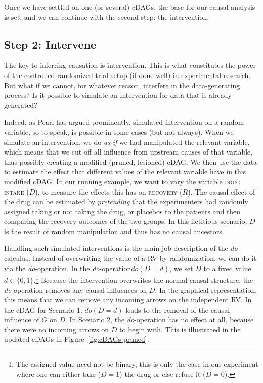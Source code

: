 \documentclass[nobib]{tufte-handout}
\newcommand{\docalc}{\emph{do}-calculus\xspace}
\newcommand{\doop}{\emph{do}-operation\xspace}
\newcommand{\mathdo}{\mathit{do}}
\begin{document}
Once we have settled on one (or several) cDAGs, the base for our causal analysis is set, and we can continue with the second step: the intervention.


\subsection{Step 2: Intervene} \label{sec:step2}

The key to inferring causation is intervention.
This is what constitutes the power of the controlled randomized trial setup (if done well) in experimental research.
But what if we cannot, for whatever reason, interfere in the data-generating process?
Is it possible to simulate an intervention for data that is already generated?


Indeed, as Pearl has argued prominently, simulated intervention on a random variable, so to speak, is possible in some cases (but not always). 
When we simulate an intervention, we do \textit{as if} we had manipulated the relevant variable, which means that we cut off all influence from upstream causes of that variable, thus possibly creating a modified (pruned, lesioned) cDAG.
We then use the data to estimate the effect that different values of the relevant variable have in this modified cDAG.
In our running example, we want to vary the variable \textsc{drug intake} ($D$), to measure the effects this has on \textsc{recovery} ($R$).
The causal effect of the drug can be estimated by \textit{pretending} that the experimenters had randomly assigned taking or not taking the drug, or placebos to the patients and then comparing the recovery outcomes of the two groups.
In this fictitious scenario, $D$ is the result of random manipulation and thus has no causal ancestors.

Handling such simulated interventions is the main job description of the \docalc. 
Instead of overwriting the value of a RV by randomization, we can do it via the \doop.
In the \doop $\mathdo(D=d)$, we set $D$ to a fixed value $d \in \{0,1\}$.\footnote{The assigned value need not be binary, this is only the case in our experiment where one can either take ($D=1$) the drug or else refuse it ($D=0$).}
Because the intervention overwrites the normal causal structure, the \doop removes any causal influences on $D$.
In the graphical representation, this means that we can remove any incoming arrows on the independent RV.
In the cDAG for Scenario 1, $\mathdo(D=d)$ leads to the removal of the causal influence of $G$ on $D$.
In Scenario 2, the \doop has no effect at all, because there were no incoming arrows on $D$ to begin with.
This is illustrated in the updated cDAGs in Figure~\ref{fig:cDAGs-pruned}.
\end{document}
